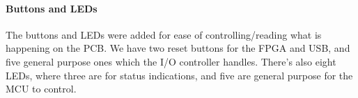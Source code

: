 \paragraph{Buttons and LEDs}

The buttons and LEDs were added for ease of controlling/reading what is
happening on the PCB. We have two reset buttons for the FPGA and USB, and five
general purpose ones which the I/O controller handles. There's also eight LEDs, where
three are for status indications, and five are general purpose for the MCU to
control.
